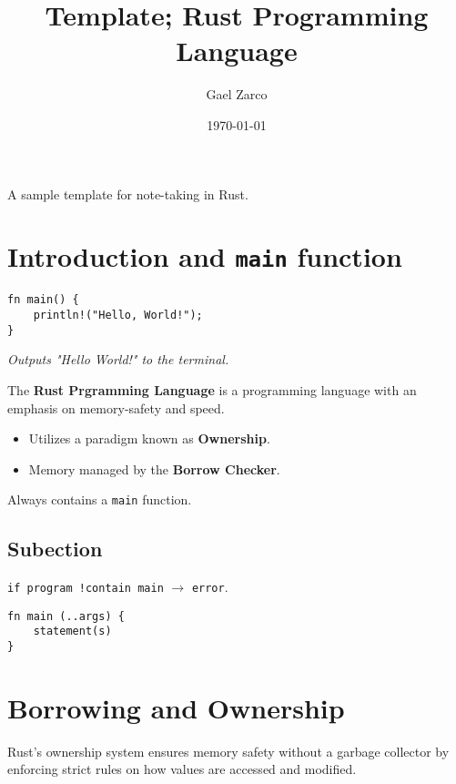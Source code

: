\documentclass{article}
\title{Template; Rust Programming Language}
\author{Gael Zarco}
\date{\today}
\begin{document}
\maketitle

A sample template for note-taking in Rust.

\section{Introduction and \texttt{main} function}

\begin{lstlisting}[caption={Example Program}]
fn main() {
    println!("Hello, World!");
}
\end{lstlisting}
\textit{Outputs "Hello World!" to the terminal.}


\vspace{8pt}
The \textbf{Rust Prgramming Language} is a programming language with an emphasis on
memory-safety and speed.
\begin{itemize}
    \item Utilizes a paradigm known as \textbf{Ownership}.
    \item Memory managed by the \textbf{Borrow Checker}.
\end{itemize}

Always contains a \texttt{main} function.

\subsection{Subection}

\texttt{if program !contain main} $\rightarrow$ \texttt{error}.

\begin{lstlisting}[caption={\texttt{main} Function Syntax}]
fn main (..args) {
    statement(s)
}
\end{lstlisting}

\section{\textbf{Borrowing} and \textbf{Ownership}}

Rust's ownership system ensures memory safety without a garbage collector by enforcing strict rules on how values are accessed and modified.
\end{document}
